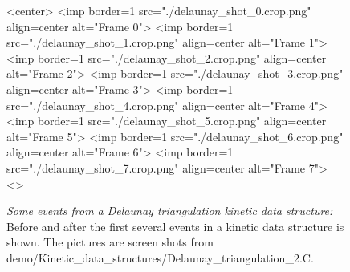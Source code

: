 \begin{figure}[htb]
\begin{ccTexOnly}
\begin{center}
\end{center}
\end{ccTexOnly}
\begin{ccHtmlOnly}
<center>
<imp border=1 src="./delaunay_shot_0.crop.png" align=center alt="Frame 0">
<imp border=1 src="./delaunay_shot_1.crop.png" align=center alt="Frame 1">
<imp border=1 src="./delaunay_shot_2.crop.png" align=center alt="Frame 2">
<imp border=1 src="./delaunay_shot_3.crop.png" align=center alt="Frame 3">
<imp border=1 src="./delaunay_shot_4.crop.png" align=center alt="Frame 4">
<imp border=1 src="./delaunay_shot_5.crop.png" align=center alt="Frame 5">
<imp border=1 src="./delaunay_shot_6.crop.png" align=center alt="Frame 6">
<imp border=1 src="./delaunay_shot_7.crop.png" align=center alt="Frame 7">
<\center>
\end{ccHtmlOnly}
\caption{ \label{fig:delaunay_events} 
{\em Some events from a Delaunay triangulation kinetic data structure:} Before and after the first several events in a kinetic data structure is shown. The pictures are screen shots from demo/Kinetic\_data\_structures/Delaunay\_triangulation\_2.C. }
\end{figure}


\label{fig:delaunay_2_usage_program}
